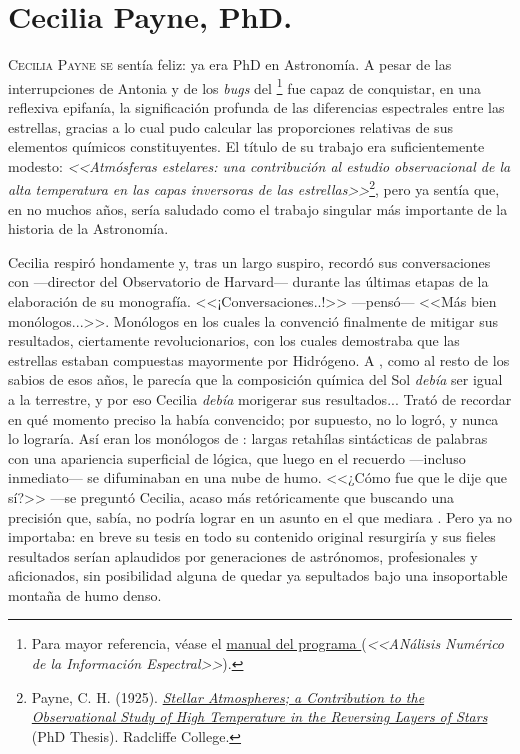 \chapter{Cecilia Payne, PhD.}

\lettrine[lines=2]{C}{ecilia Payne se} sentía feliz: ya era PhD en
Astronomía. A pesar de las interrupciones de Antonia y de los
\emph{bugs} del \annielogo{}\footnote{Para mayor referencia, véase el
  \href{https://drive.google.com/file/d/1QVz8UakYxqXMUqMXYt0nZgtviCBPOn8g/view?usp=sharing}{manual
    del programa \annielogo{}} (\emph{<<ANálisis Numérico de la
    Información Espectral>>}).} fue capaz de conquistar, en una
reflexiva epifanía, la significación profunda de las diferencias
espectrales entre las estrellas, gracias a lo cual pudo calcular las
proporciones relativas de sus elementos químicos constituyentes. El
título de su trabajo era suficientemente modesto: \emph{<<Atmósferas
  estelares: una contribución al estudio observacional de la alta
  temperatura en las capas inversoras de las
  estrellas>>}\footnote{Payne,
  C. H. (1925). \emph{\href{http://adsabs.harvard.edu/full/1925PhDT.........1P}{Stellar
      Atmospheres; a Contribution to the Observational Study of High
      Temperature in the Reversing Layers of Stars}} (PhD
  Thesis). Radcliffe College.}, pero ya sentía que, en no muchos años,
sería saludado como el trabajo singular más importante de la historia
de la Astronomía.

Cecilia respiró hondamente y, tras un largo suspiro, recordó sus
conversaciones con \director{} ---director del Observatorio de
Harvard--- durante las últimas etapas de la elaboración de su
monografía. <<¡Conversaciones..!>> ---pen\-só--- <<Más bien
monólogos...>>. Monólogos en los cuales \director{} la convenció
finalmente de mitigar sus resultados, ciertamente revolucionarios, con
los cuales demostraba que las estrellas estaban compuestas mayormente
por Hidrógeno. A \director{}, como al resto de los sabios de esos
años, le parecía que la composición química del Sol \emph{debía} ser
igual a la terrestre, y por eso Cecilia \emph{debía} morigerar sus
resultados... Trató de recordar en qué momento preciso la había
convencido; por supuesto, no lo logró, y nunca lo lograría. Así eran
los monólogos de \director{}: largas retahílas sintácticas de palabras
con una apariencia superficial de lógica, que luego en el recuerdo
---incluso inmediato--- se difuminaban en una nube de humo. <<¿Cómo
fue que le dije que sí?>> ---se preguntó Cecilia, acaso más
retóricamente que buscando una precisión que, sabía, no podría lograr
en un asunto en el que mediara \director{}. Pero ya no importaba: en
breve su tesis en todo su contenido original resurgiría y sus fieles
resultados serían aplaudidos por generaciones de astrónomos,
profesionales y aficionados, sin posibilidad alguna de quedar ya
sepultados bajo una insoportable montaña de humo denso.

